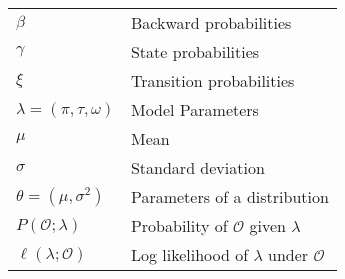 \begin{table}[htb!]
\begin{tabular}{ll}
        $\beta$                         & Backward probabilities                          \\
        $\gamma$                        & State probabilities                             \\
        $\xi$                           & Transition probabilities                        \\
        $\lambda = (\pi, \tau, \omega)$ & Model Parameters                                \\
        $\mu$                           & Mean                                            \\
        $\sigma$                        & Standard deviation                              \\
        $\theta = (\mu, \sigma^2)$      & Parameters of a distribution                    \\
        $P(\mathcal{O}; \lambda)$       & Probability of $\mathcal{O}$ given $\lambda$    \\
        $\ell(\lambda ;\mathcal{O})$    & Log likelihood of $\lambda$ under $\mathcal{O}$ \\
        \bottomrule
    \end{tabular}
\end{table}
